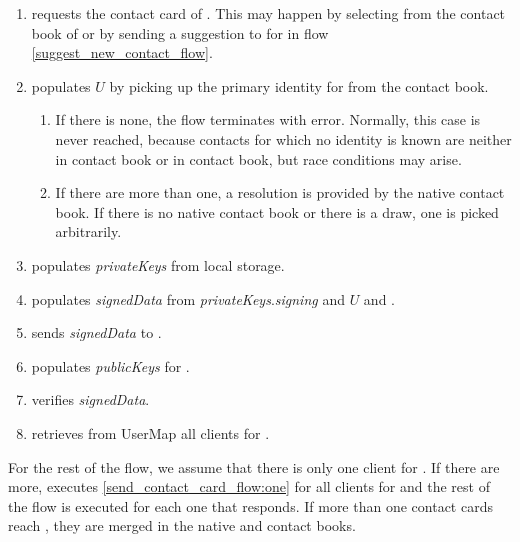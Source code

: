 \documentclass[a4paper,10pt]{article}
\newcommand{\signedData}{\emph{signedData}}
\newcommand{\privateKeys}{\emph{privateKeys}}
\newcommand{\publicKeys}{\emph{publicKeys}}
\newcommand{\signingKey}{\privateKeys{}.\emph{signing}}
\newcommand{\userId}[1]{\parenthesize{userId}{#1}}
\begin{document}
\begin{enumerate}
 \item {} requests the contact card of . This may happen by  selecting  from the contact book of  or by \Server{} sending a suggestion to  for  in flow \ref{suggest_new_contact_flow}.
 \item {} populates $U$ by picking up the primary identity for  from the \longProduct{} contact book.
 \begin{enumerate}
  \item If there is none, the flow terminates with error. Normally, this case is never reached, because contacts for which no identity is known are neither in \longProduct{} contact book or in \Server{} contact book, but race conditions may arise.
  \item If there are more than one, a resolution is provided by the native contact book. If there is no native contact book or there is a draw, one is picked arbitrarily.
 \end{enumerate}
 \item {} populates \privateKeys{} from local storage.
 \item {} populates \signedData{} from \signingKey{} and $U$ and \userId{B}.
 \item {} sends \signedData{} to \Server{}.
 \item \Server{} populates \publicKeys{} for .
 \item \Server{} verifies \signedData{}.
 \item \Server{} retrieves from UserMap all clients for \userId{B}.
\end{enumerate}
For the rest of the flow, we assume that there is only one client for . If there are more, \Server{} executes \ref{send_contact_card_flow:one} for all clients for \userId{B} and the rest of the flow is executed for each one that responds. If more than one contact cards reach , they are merged in the native and \longProduct{} contact books.
\end{document}
